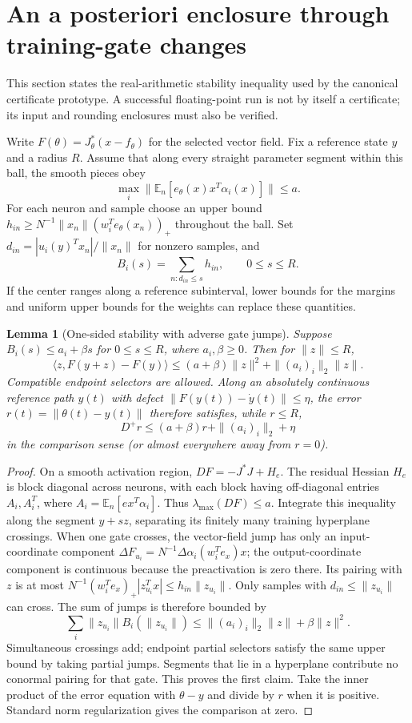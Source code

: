 \documentclass[10pt]{article}
\newtheorem{lemma}[theorem]{Lemma}
\newcommand{\E}{\mathbb E}
\begin{document}
\section{An a posteriori enclosure through training-gate changes}
This section states the real-arithmetic stability inequality used by the
canonical certificate prototype. A successful floating-point run is not by
itself a certificate; its input and rounding enclosures must also be verified.

Write $F(\theta)=J_\theta^*(x-f_\theta)$ for the selected vector field.
Fix a reference state $y$ and a radius $R$. Assume that along every straight
parameter segment within this ball, the smooth pieces obey
\[
 \max_i\|\E_n[e_\theta(x)x^T\alpha_i(x)]\|\le a.
\]
For each neuron and sample choose an upper bound
$h_{in}\ge N^{-1}\|x_n\|(w_i^Te_\theta(x_n))_+$ throughout the ball.
Set $d_{in}=|u_i(y)^Tx_n|/\|x_n\|$ for nonzero samples, and
\[
 B_i(s)=\sum_{n:d_{in}\le s}h_{in},\qquad 0\le s\le R.
\]
If the center ranges along a reference subinterval, lower bounds for the
margins and uniform upper bounds for the weights can replace these quantities.

\begin{lemma}[One-sided stability with adverse gate jumps]\label{lem:tube}
Suppose $B_i(s)\le a_i+\beta s$ for $0\le s\le R$, where $a_i,\beta\ge0$.
Then for $\|z\|\le R$,
\[
 \langle z,F(y+z)-F(y)\rangle
 \le(a+\beta)\|z\|^2+\|(a_i)_i\|_2\|z\|.
\]
Compatible endpoint selectors are allowed. Along an absolutely continuous
reference path $y(t)$ with defect $\|F(y(t))-\dot y(t)\|\le\eta$, the
error $r(t)=\|\theta(t)-y(t)\|$ therefore satisfies, while $r\le R$,
\[
 D^+r\le(a+\beta)r+\|(a_i)_i\|_2+\eta
\]
in the comparison sense (or almost everywhere away from $r=0$).
\end{lemma}
\begin{proof}
On a smooth activation region,
$DF=-J^*J+H_e$. The residual Hessian $H_e$ is block diagonal across
neurons, with each block having off-diagonal entries $A_i,A_i^T$, where
$A_i=\E_n[e x^T\alpha_i]$. Thus $\lambda_{\max}(DF)\le a$.
Integrate this inequality along the segment $y+sz$, separating its finitely
many training hyperplane crossings. When one gate crosses, the vector-field
jump has only an input-coordinate component
$\Delta F_{u_i}=N^{-1}\Delta\alpha_i(w_i^Te_x)x$; the output-coordinate
component is continuous because the preactivation is zero there. Its pairing
with $z$ is at most
$N^{-1}(w_i^Te_x)_+|z_{u_i}^Tx|\le h_{in}\|z_{u_i}\|$.
Only samples with $d_{in}\le\|z_{u_i}\|$ can cross. The sum of jumps is
therefore bounded by
\[
 \sum_i\|z_{u_i}\|B_i(\|z_{u_i}\|)
 \le\|(a_i)_i\|_2\|z\|+\beta\|z\|^2.
\]
Simultaneous crossings add; endpoint partial selectors satisfy the same
upper bound by taking partial jumps. Segments that lie in a hyperplane
contribute no conormal pairing for that gate. This proves the first claim.
Take the inner product of the error equation with $\theta-y$ and divide
by $r$ when it is positive. Standard norm regularization gives the comparison
at zero.
\end{proof}
\end{document}
